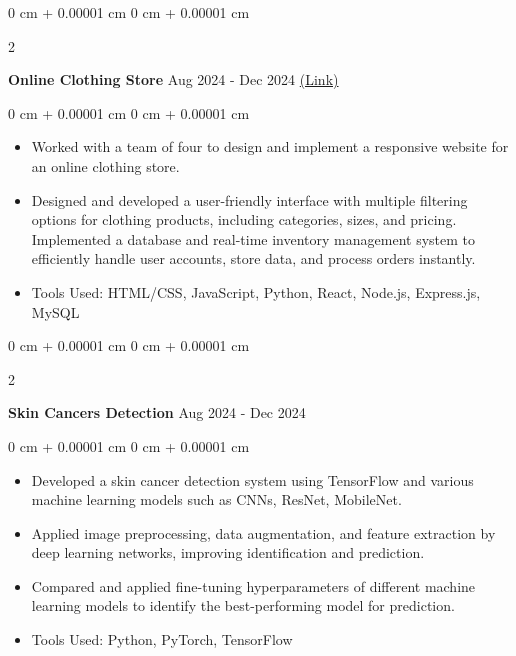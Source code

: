 \documentclass[10pt, letterpaper]{article}
\newenvironment{highlights}{
    \begin{itemize}[
        topsep=0.10 cm,
        parsep=0.10 cm,
        partopsep=0pt,
        itemsep=0pt,
        leftmargin=0 cm + 10pt
    ]
}{
    \end{itemize}
} %
\newenvironment{onecolentry}{
    \begin{adjustwidth}{
        0 cm + 0.00001 cm
    }{
        0 cm + 0.00001 cm
    }
}{
    \end{adjustwidth}
} %
\newenvironment{twocolentry}[2][]{
    \onecolentry
    \def\secondColumn{#2}
    \setcolumnwidth{\fill, 4.5 cm}
    \begin{paracol}{2}
}{
    \switchcolumn \raggedleft \secondColumn
    \end{paracol}
    \endonecolentry
} %
\begin{document}
        \begin{twocolentry}{
            Aug 2024 - Dec 2024 \href{https://github.com/WyattLamberth/Clothing-Store}{(Link)}
        }
            \textbf{Online Clothing Store}\end{twocolentry}
        \vspace{0.10 cm}
        \begin{onecolentry}
            \begin{highlights}
                \item Worked with a team of four to design and implement a responsive website for an online clothing store.
                \item Designed and developed a user-friendly interface with multiple filtering options for clothing products, including categories, sizes, and pricing. Implemented a database and real-time inventory management system to efficiently handle user accounts, store data, and process orders instantly. 
                \item Tools Used: HTML/CSS, JavaScript, Python, React, Node.js, Express.js, MySQL
            \end{highlights}
        \end{onecolentry}


        \vspace{0.3 cm}

        \begin{twocolentry}{Aug 2024 - Dec 2024}
            \textbf{Skin Cancers Detection}\end{twocolentry}

        \vspace{0.10 cm}
        \begin{onecolentry}
            \begin{highlights}
                \item Developed a skin cancer detection system using TensorFlow and various machine learning models such as CNNs, ResNet, MobileNet.
                \item Applied image preprocessing, data augmentation, and feature extraction by deep learning networks, improving identification and prediction.
                \item Compared and applied fine-tuning hyperparameters of different machine learning models to identify the best-performing model for prediction.
                \item Tools Used: Python, PyTorch, TensorFlow
            \end{highlights}
        \end{onecolentry}
\end{document}
